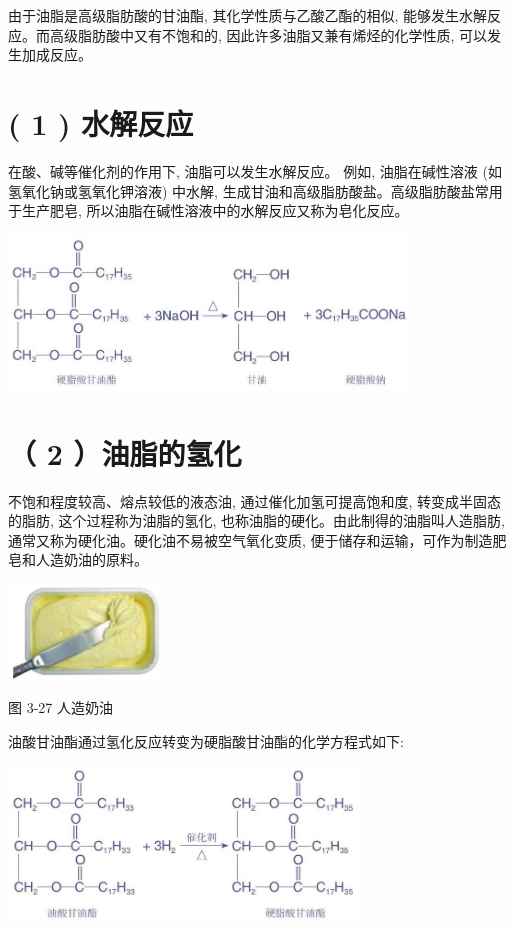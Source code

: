 \documentclass[10pt]{article}
\begin{document}
由于油脂是高级脂肪酸的甘油酯, 其化学性质与乙酸乙酯的相似, 能够发生水解反应。而高级脂肪酸中又有不饱和的, 因此许多油脂又兼有烯烃的化学性质, 可以发生加成反应。

\section*{( 1 ) 水解反应}

在酸、碱等催化剂的作用下, 油脂可以发生水解反应。 例如, 油脂在碱性溶液 (如氢氧化钠或氢氧化钾溶液) 中水解, 生成甘油和高级脂肪酸盐。高级脂肪酸盐常用于生产肥皂, 所以油脂在碱性溶液中的水解反应又称为皂化反应。

\begin{center}
\includegraphics[max width=0.8\textwidth]{images/0190efc5-b58a-7c43-bfb0-e0a030df9cfd_84_240611.jpg}
\end{center}

\section*{（ 2 ）油脂的氢化}

不饱和程度较高、熔点较低的液态油, 通过催化加氢可提高饱和度, 转变成半固态的脂肪, 这个过程称为油脂的氢化, 也称油脂的硬化。由此制得的油脂叫人造脂肪, 通常又称为硬化油。硬化油不易被空气氧化变质, 便于储存和运输，可作为制造肥皂和人造奶油的原料。

\begin{center}
\includegraphics[max width=0.3\textwidth]{images/0190efc5-b58a-7c43-bfb0-e0a030df9cfd_84_428607.jpg}
\end{center}

图 3-27 人造奶油

油酸甘油酯通过氢化反应转变为硬脂酸甘油酯的化学方程式如下:

\begin{center}
\includegraphics[max width=0.7\textwidth]{images/0190efc5-b58a-7c43-bfb0-e0a030df9cfd_85_149258.jpg}
\end{center}
\end{document}
